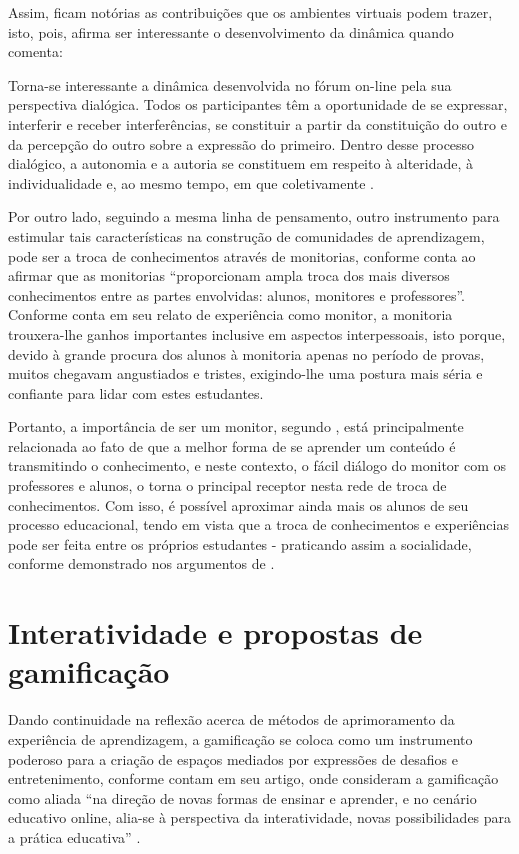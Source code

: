Assim, ficam notórias as contribuições que os ambientes virtuais podem trazer, isto, pois,  afirma ser interessante o desenvolvimento da dinâmica quando comenta:

\begin{citacao}
Torna-se interessante a dinâmica desenvolvida no fórum on-line pela sua perspectiva dialógica. Todos os participantes têm a oportunidade de se expressar, interferir e receber interferências, se constituir a partir da constituição do outro e da percepção do outro sobre a expressão do primeiro. Dentro desse processo dialógico, a autonomia e a autoria se constituem em respeito à alteridade, à individualidade e, ao mesmo tempo, em que coletivamente \cite{kratochwill2006possibilidades}.
\end{citacao}

Por outro lado, seguindo a mesma linha de pensamento, outro instrumento para estimular tais características na construção de comunidades de aprendizagem, pode ser a troca de conhecimentos através de monitorias, conforme conta  ao afirmar que as monitorias ``proporcionam ampla troca dos mais diversos conhecimentos entre as partes envolvidas: alunos, monitores e professores''. 
Conforme  conta em seu relato de experiência como monitor, a monitoria trouxera-lhe ganhos importantes inclusive em aspectos interpessoais, isto porque, devido à grande procura dos alunos à monitoria apenas no período de provas, muitos chegavam angustiados e tristes, exigindo-lhe uma postura mais séria e confiante para lidar com estes estudantes.

Portanto, a importância de ser um monitor, segundo , está principalmente relacionada ao fato de que a melhor forma de se aprender um conteúdo é transmitindo o conhecimento, e neste contexto, o fácil diálogo do monitor com os professores e alunos, o torna o principal receptor nesta rede de troca de conhecimentos. Com isso, é possível aproximar ainda mais os alunos de seu processo educacional, tendo em vista que a troca de conhecimentos e experiências pode ser feita entre os próprios estudantes - praticando assim a socialidade, conforme demonstrado nos argumentos de .

\section{Interatividade e propostas de gamificação}
Dando continuidade na reflexão acerca de métodos de aprimoramento da experiência de aprendizagem, a gamificação se coloca como um instrumento poderoso para a criação de espaços mediados por expressões de desafios e entretenimento, conforme contam  em seu artigo, onde consideram a gamificação como aliada “na direção de novas formas de ensinar e aprender, e no cenário educativo online, alia-se à perspectiva da interatividade, novas possibilidades para a prática educativa” \cite{valentim2016interatividade}.

